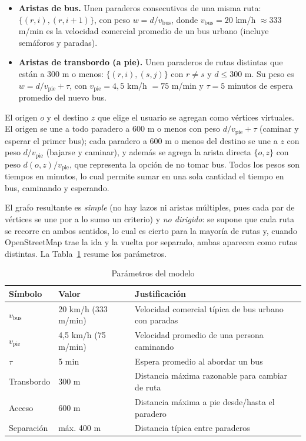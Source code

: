 \documentclass[12pt,letterpaper]{article}
\begin{document}
\begin{itemize}
\item \textbf{Aristas de bus.} Unen paraderos consecutivos de una misma ruta: $\{(r,i),(r,i+1)\}$, con peso $w=d/v_{\text{bus}}$, donde $v_{\text{bus}}=20$ km/h $\approx 333$ m/min es la velocidad comercial promedio de un bus urbano (incluye semáforos y paradas).
\item \textbf{Aristas de transbordo (a pie).} Unen paraderos de rutas distintas que están a 300 m o menos: $\{(r,i),(s,j)\}$ con $r\neq s$ y $d\le 300$ m. Su peso es $w=d/v_{\text{pie}}+\tau$, con $v_{\text{pie}}=4{,}5$ km/h $=75$ m/min y $\tau=5$ minutos de espera promedio del nuevo bus.
\end{itemize}

El origen $o$ y el destino $z$ que elige el usuario se agregan como vértices virtuales. El origen se une a todo paradero a 600 m o menos con peso $d/v_{\text{pie}}+\tau$ (caminar y esperar el primer bus); cada paradero a 600 m o menos del destino se une a $z$ con peso $d/v_{\text{pie}}$ (bajarse y caminar), y además se agrega la arista directa $\{o,z\}$ con peso $d(o,z)/v_{\text{pie}}$, que representa la opción de no tomar bus. Todos los pesos son tiempos en minutos, lo cual permite sumar en una sola cantidad el tiempo en bus, caminando y esperando.

El grafo resultante es \textit{simple} (no hay lazos ni aristas múltiples, pues cada par de vértices se une por a lo sumo un criterio) y \textit{no dirigido}: se supone que cada ruta se recorre en ambos sentidos, lo cual es cierto para la mayoría de rutas y, cuando OpenStreetMap trae la ida y la vuelta por separado, ambas aparecen como rutas distintas. La Tabla~\ref{tab:param} resume los parámetros.

\begin{table}[H]
\centering
\caption{Parámetros del modelo}\label{tab:param}
\begin{tabular}{lll}
\toprule
Símbolo & Valor & Justificación \\
\midrule
$v_{\text{bus}}$ & 20 km/h (333 m/min) & Velocidad comercial típica de bus urbano con paradas \\
$v_{\text{pie}}$ & 4,5 km/h (75 m/min) & Velocidad promedio de una persona caminando \\
$\tau$ & 5 min & Espera promedio al abordar un bus \\
Transbordo & 300 m & Distancia máxima razonable para cambiar de ruta \\
Acceso & 600 m & Distancia máxima a pie desde/hasta el paradero \\
Separación & máx. 400 m & Distancia típica entre paraderos \\
\bottomrule
\end{tabular}
\end{table}
\end{document}
